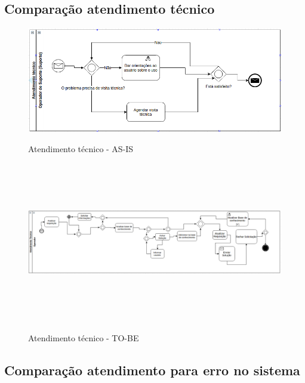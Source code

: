 \subsection{Comparação atendimento técnico}

\begin{figure}[!h]
\caption{Atendimento técnico - AS-IS}
\centering %
\includegraphics[width=15cm]{as-is/02_atendimento_tecnico.png}
\label{figura:suporte_tecnico_as_is}
\end{figure}

\begin{figure}[!h]
\caption{Atendimento técnico - TO-BE}
\centering %
\includegraphics[width=16cm,height=7cm]{to_be/02_atendimento_tecnico.png}
\label{figura:suporte_tecnico_to_be}
\end{figure}

\clearpage
\subsection{Comparação atendimento para erro no sistema}


